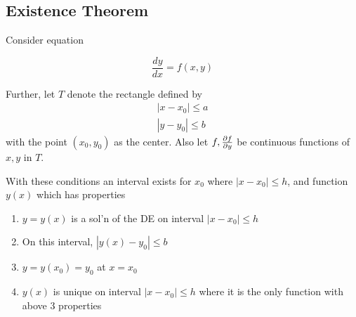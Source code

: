 \subsection{Existence Theorem}

Consider equation

\begin{equation}
    \frac{dy}{dx}=f(x,y)
\end{equation}

Further, let $T$ denote the rectangle defined by
\begin{eqnarray}
    |x-x_0|\leq a\\
    |y-y_0|\leq b
\end{eqnarray}
with the point $(x_0,y_0)$ as the center.
Also let $f,\frac{\partial f}{\partial y}$ be continuous functions of $x,y$ in $T$.

With these conditions an interval exists for $x_0$ where $|x-x_0|\leq h$, and function $y(x)$
which has properties
\begin{enumerate}
    \item $y=y(x)$ is a sol'n of the DE on interval $|x-x_0|\leq h$
    \item On this interval, $|y(x)-y_0|\leq b$
    \item $y=y(x_0)=y_0$ at $x=x_0$
    \item $y(x)$ is unique on interval $|x-x_0|\leq h$ where it is the only function with above 3 properties
\end{enumerate}